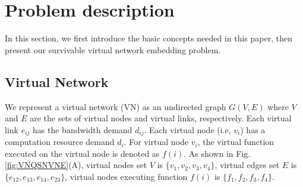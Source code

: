 \section{Problem description}
\label{sec:Problem description}
In this section, we first introduce the basic concepts needed in this paper, then present our survivable virtual network embedding problem.





\subsection{Virtual Network}
We represent a virtual network (VN) as an undirected graph $G (V,E)$ where $V$ and  $E$ are the sets of virtual nodes and virtual links, respectively. Each virtual link $e_{ij}$ has the bandwidth demand $d_{ij}$. Each virtual node (i.e, $v_i$) has a computation resource demand $d_i$. For virtual node $v_i$, the virtual function executed on the virtual node is denoted as $f(i)$. As shown in Fig.\ref{fig:VNQSNVNE}(A), virtual nodes set $V$ is $\{v_1,v_2,v_3,v_4\}$, virtual edges set $E$ is $\{e_{12},e_{13},e_{14},e_{23}\}$, virtual nodes executing function $f(i)$ is $\{f_1,f_2,f_3,f_4\}$.

